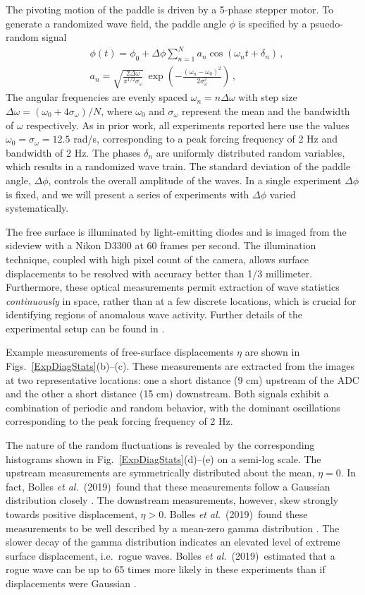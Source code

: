 \documentclass[11pt]{article}
\newcommand{\omavg}{\omega_0}
\newcommand{\omsig}{\sigma_{\omega}}
\newcommand{\Dphi}{\Delta \phi}
\newcommand{\boetal}{Bolles {\it et al.}~(2019)~}
\begin{document}
The pivoting motion of the paddle is driven by a 5-phase stepper motor. To generate a randomized wave field, the paddle angle $\phi$ is specified by a psuedo-random signal
\begin{align}
\label{PaddleAngle}
& \phi(t) = \phi_0 + \Dphi \sum_{n=1}^N a_n \cos(\omega_n t+\delta_n) \, , \\
\label{anEq}
& a_n = \sqrt{\frac{2 \Delta \omega}{\pi^{1/2} \omsig}} \, 
\exp \left( -\frac{(\omega_n - \omavg)^2}{2 \omsig^2} \right) \, ,
\end{align}
The angular frequencies are evenly spaced $\omega_n = n  \Delta \omega$ with step size $ \Delta \omega = (\omavg+4 \omsig)/N$, where $\omavg$ and $\omsig$ represent the mean and the bandwidth of $\omega$ respectively. As in prior work, all experiments reported here use the values $\omavg = \omsig = 12.5$ rad/s, corresponding to a peak forcing frequency of 2 Hz and bandwidth of 2 Hz. The phases $\delta_n$ are uniformly distributed random variables, which results in a randomized wave train. The standard deviation of the paddle angle, $\Dphi$, controls the overall amplitude of the waves. In a single experiment $\Dphi$ is fixed, and we will present a series of experiments with $\Dphi$ varied systematically. 
 


The free surface is illuminated by light-emitting diodes and is imaged from the sideview with a Nikon D3300 at 60 frames per second. The illumination technique, coupled with high pixel count of the camera, allows surface displacements to be resolved with accuracy better than 1/3 millimeter. Furthermore, these optical measurements permit extraction of wave statistics {\em continuously} in space, rather than at a few discrete locations, which is crucial for identifying regions of anomalous wave activity. Further details of the experimental setup can be found in \cite{bolles2019}.
	
Example measurements of free-surface displacements $\eta$ are shown in Figs.~\ref{ExpDiagStats}(b)--(c). These measurements are extracted from the images at two representative locations: one a short distance (9 cm) upstream of the ADC and the other a short distance (15 cm) downstream. Both signals exhibit a combination of periodic and random behavior, with the dominant oscillations corresponding to the peak forcing frequency of 2 Hz. 
	
The nature of the random fluctuations is revealed by the corresponding histograms shown in Fig.~\ref{ExpDiagStats}(d)--(e) on a semi-log scale. The upstream measurements are symmetrically distributed about the mean, $\eta = 0$. In fact, \boetal found that these measurements follow a Gaussian distribution closely \cite{bolles2019}. The downstream measurements, however, skew strongly towards positive displacement, $\eta > 0$. \boetal found these measurements to be well described by a mean-zero gamma distribution \cite{bolles2019}. The slower decay of the gamma distribution indicates an elevated level of extreme surface displacement, i.e.~rogue waves. \boetal estimated that a rogue wave can be up to 65 times more likely in these experiments than if displacements were Gaussian \cite{bolles2019}. 
\end{document}
